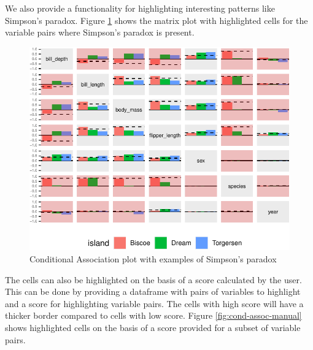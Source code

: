 We also provide a functionality for highlighting interesting patterns
like Simpson's paradox. Figure \ref{fig:cond-assoc-sp} shows the matrix
plot with highlighted cells for the variable pairs where Simpson's
paradox is present.

\begin{Schunk}
\begin{figure}

{\centering \includegraphics{rj_paper_files/figure-latex/cond-assoc-sp-1} 

}

\caption[Conditional Association plot with examples of Simpson's paradox]{Conditional Association plot with examples of Simpson's paradox}\label{fig:cond-assoc-sp}
\end{figure}
\end{Schunk}

The cells can also be highlighted on the basis of a score calculated by
the user. This can be done by providing a dataframe with pairs of
variables to highlight and a score for highlighting variable pairs. The
cells with high score will have a thicker border compared to cells with
low score. Figure \ref{fig:cond-assoc-manual} shows highlighted cells on
the basis of a score provided for a subset of variable pairs.

